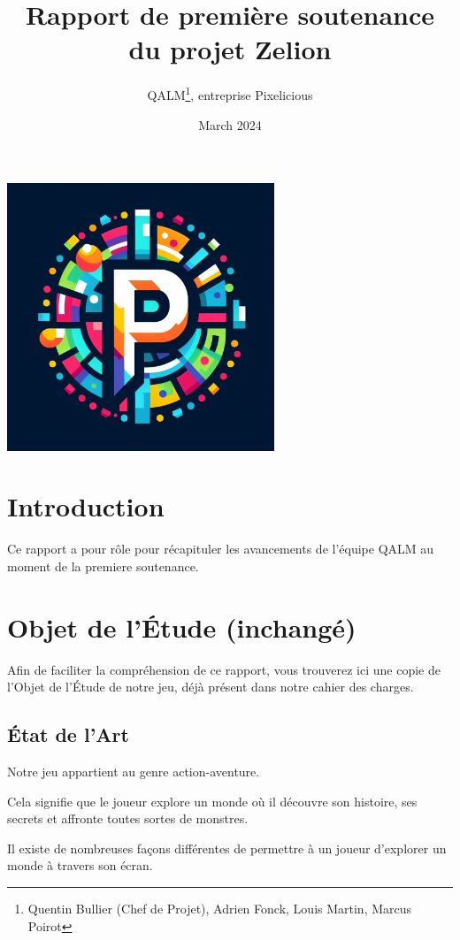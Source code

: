 \documentclass[a4page, 14pt]{extarticle}
\title{Rapport de première soutenance du projet Zelion}
\author{QALM\footnote{Quentin Bullier (Chef de Projet), Adrien Fonck, Louis Martin, Marcus Poirot}, entreprise Pixelicious}
\date{March 2024}
\begin{document}
\maketitle

\begin{center}
        \includegraphics[width=8cm]{logo}
\end{center}

\newpage
\renewcommand{\contentsname}{Table des matières}
\tableofcontents
\newpage

\section{Introduction}
    {Ce rapport a pour rôle pour récapituler les avancements de l'équipe QALM au moment de la premiere soutenance.}
    
\section{Objet de l'Étude (inchangé)}
    {Afin de faciliter la compréhension de ce rapport, vous trouverez ici une copie de l'Objet de l'Étude de notre jeu, déjà présent dans notre cahier des charges.}

\subsection{État de l'Art}
    {Notre jeu appartient au genre action-aventure.

    Cela signifie que le joueur explore un monde où il découvre son histoire, ses secrets et affronte toutes sortes de monstres.

    Il existe de nombreuses façons différentes de permettre à un joueur d'explorer un monde à travers son écran.}
\end{document}
